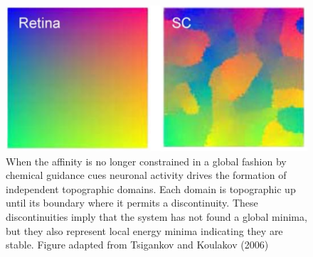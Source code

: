 \begin{figure}[h!]
	\centering
	\includegraphics[width = \textwidth]{images/introduction/koulakov_domains}
	\def\c{When the affinity is no longer constrained in a global fashion by chemical guidance cues neuronal activity drives the formation of independent topographic domains. }
	\caption[\c]{\c Each domain is topographic up until its boundary where it permits a discontinuity. These discontinuities imply that the system has not found a global minima, but they also represent local energy minima indicating they are stable. Figure adapted from Tsigankov and Koulakov (2006) \cite{Tsigankov2006-uy}\label{fig:activitydomain}} 
\end{figure}

